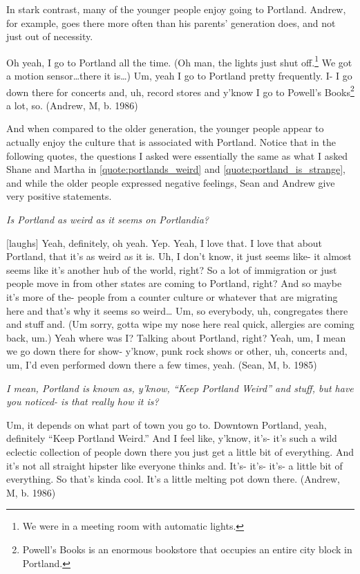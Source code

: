 In stark contrast, many of the younger people enjoy going to Portland. Andrew, for example,  goes there more often than his parents' generation does, and not just out of necessity.
\begin{num_quote}
    Oh yeah, I go to Portland all the time. (Oh man, the lights just shut off.\footnote{We were in a meeting room with automatic lights.} We got a motion sensor\ldots there it is\ldots) Um, yeah I go to Portland pretty frequently. I- I go down there for concerts and, uh, record stores and y'know I go to Powell's Books\footnote{Powell's Books is an enormous bookstore that occupies an entire city block in Portland.} a lot, so. (Andrew, M, b. 1986)
    \label{quote:portland_all_the_time}
\end{num_quote}
And when compared to the older generation, the younger people appear to actually enjoy the culture that is associated with Portland. Notice that in the following quotes, the questions I asked were essentially the same as what I asked Shane and Martha in \ref{quote:portlands_weird} and \ref{quote:portland_is_strange}, and while the older people expressed negative feelings, Sean and Andrew give very positive statements.
\begin{num_quote}
    \textit{Is Portland as weird as it seems on Portlandia?}

    [laughs] Yeah, definitely, oh yeah. Yep. Yeah, I love that. I love that about Portland, that it's as weird as it is. Uh, I don't know, it just seems like- it almost seems like it's another hub of the world, right? So a lot of immigration or just people move in from other states are coming to Portland, right? And so maybe it's more of the- people from a counter culture or whatever that are migrating here and that's why it seems so weird… Um, so everybody, uh, congregates there and stuff and. (Um sorry, gotta wipe my nose here real quick, allergies are coming back, um.) Yeah where was I? Talking about Portland, right? Yeah, um, I mean we go down there for show- y'know, punk rock shows or other, uh, concerts and, um, I'd even performed down there a few times, yeah. (Sean, M, b. 1985)\label{quote:i_love_portland}
\end{num_quote}
\begin{num_quote}
    \textit{I mean, Portland is known as, y'know, ``Keep Portland Weird'' and stuff, but have you noticed- is that really how it is?}

    Um, it depends on what part of town you go to. Downtown Portland, yeah, definitely ``Keep Portland Weird.'' And I feel like, y'know, it's- it's such a wild eclectic collection of people down there you just get a little bit of everything. And it's not all straight hipster like everyone thinks and. It's- it's- it's- a little bit of everything. So that's kinda cool. It's a little melting pot down there. (Andrew, M, b. 1986)\label{quote:keep_portland_weird}
\end{num_quote}
